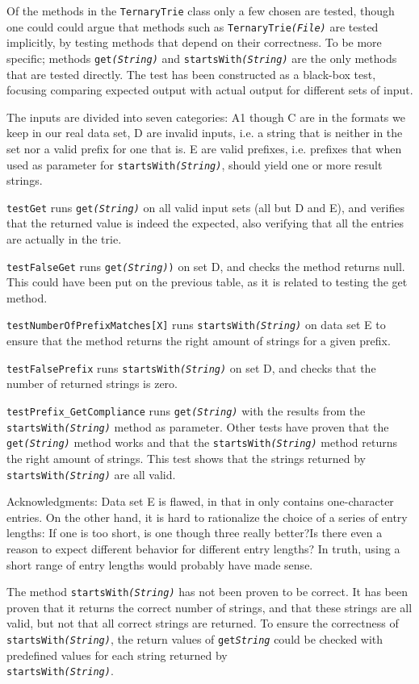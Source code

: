 Of the methods in the \texttt{TernaryTrie} class only a few chosen are tested, though one could could argue that methods such as \texttt{TernaryTrie\textit{(File)}} are tested implicitly, by testing methods that depend on their correctness.
To be more specific; methods \texttt{get\textit{(String)}} and \texttt{startsWith\textit{(String)}} are the only methods that are tested directly.  The test has been constructed as a black-box test, focusing comparing expected output with actual output for different sets of input.

The inputs are divided into seven categories:
A1 though C are in the formats we keep in our real data set, D are invalid inputs, i.e. a string that is neither in the set nor a valid prefix for one that is.
E are valid prefixes, i.e. prefixes that when used as parameter for \texttt{startsWith\textit{(String)}}, should yield one or more result strings.

\texttt{testGet} runs \texttt{get\textit{(String)}} on all valid input sets (all but D and E), and verifies that the returned value is indeed the expected, also verifying that all the entries are actually in the trie.

\texttt{testFalseGet} runs \texttt{get\textit{(String)})} on set D, and checks the method returns null. This could have been put on the previous table, as it is related to testing the get method.

\texttt{testNumberOfPrefixMatches[X]} runs \texttt{startsWith\textit{(String)}} on data set E to ensure that the method returns the right amount of strings for a given prefix.

\texttt{testFalsePrefix} runs \texttt{startsWith\textit{(String)}} on set D, and checks that the number of returned strings is zero.

\texttt{testPrefix\_GetCompliance} runs \texttt{get\textit{(String)}} with the results from the \texttt{startsWith\textit{(String)}} method as parameter. Other tests have proven that the \texttt{get\textit{(String)}} method works and that the \texttt{startsWith\textit{(String)}} method returns the right amount of strings. This test shows that the strings returned by \texttt{startsWith\textit{(String)}} are all valid.

Acknowledgments:
Data set E is flawed, in that in only contains one-character entries. On the other hand, it is hard to rationalize the choice  of a series of entry lengths: If one is too short, is one though three really better?Is there even a reason to expect different behavior for different entry lengths? In truth, using a short range of entry lengths would probably have made sense.

The method \texttt{startsWith\textit{(String)}} has not been proven to be correct. It has been proven that it returns the correct number of strings, and that these strings are all valid, but not that all correct strings are returned. To ensure the correctness of \texttt{startsWith\textit{(String)}}, the return values of \texttt{get\textit{String}} could be checked with predefined values for each string returned by \\ \texttt{startsWith\textit{(String)}}.
